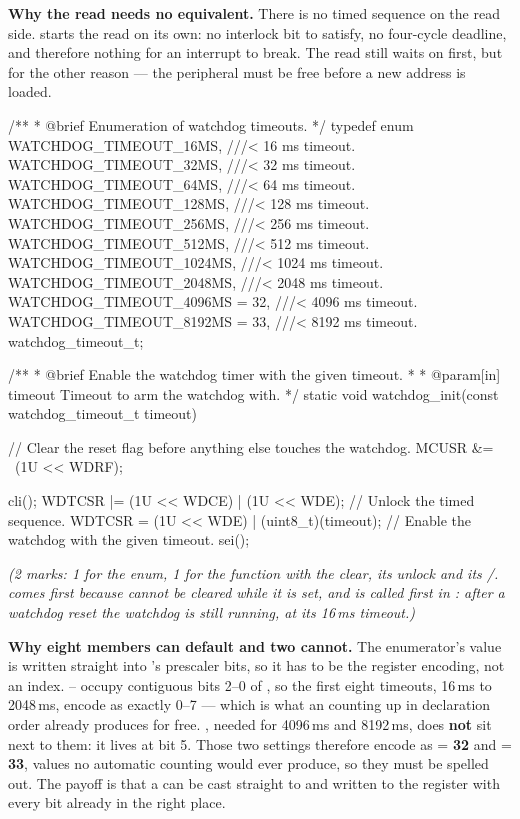 \textbf{Why the read needs no equivalent.} There is no timed sequence on the read side. 
starts the read on its own: no interlock bit to satisfy, no four-cycle deadline, and therefore
nothing for an interrupt to break. The read still waits on  first, but for the other
reason --- the peripheral must be free before a new address is loaded. 

\begin{ccode}
/**
 * @brief Enumeration of watchdog timeouts.
 */
typedef enum
{
    WATCHDOG_TIMEOUT_16MS,        ///< 16 ms timeout.
    WATCHDOG_TIMEOUT_32MS,        ///< 32 ms timeout.
    WATCHDOG_TIMEOUT_64MS,        ///< 64 ms timeout.
    WATCHDOG_TIMEOUT_128MS,       ///< 128 ms timeout.
    WATCHDOG_TIMEOUT_256MS,       ///< 256 ms timeout.
    WATCHDOG_TIMEOUT_512MS,       ///< 512 ms timeout.
    WATCHDOG_TIMEOUT_1024MS,      ///< 1024 ms timeout.
    WATCHDOG_TIMEOUT_2048MS,      ///< 2048 ms timeout.
    WATCHDOG_TIMEOUT_4096MS = 32, ///< 4096 ms timeout.
    WATCHDOG_TIMEOUT_8192MS = 33, ///< 8192 ms timeout.
} watchdog_timeout_t;

/**
 * @brief Enable the watchdog timer with the given timeout.
 *
 * @param[in] timeout Timeout to arm the watchdog with.
 */
static void watchdog_init(const watchdog_timeout_t timeout)
{
    // Clear the reset flag before anything else touches the watchdog.
    MCUSR &= ~(1U << WDRF);

    cli();
    WDTCSR |= (1U << WDCE) | (1U << WDE);      // Unlock the timed sequence.
    WDTCSR = (1U << WDE) | (uint8_t)(timeout); // Enable the watchdog with the given timeout.
    sei();
}
\end{ccode}

{\itshape (2 marks: 1 for the enum, 1 for the function with the  clear, its unlock and
its /.  comes first because  cannot be cleared while it
is set, and  is called first in : after a watchdog reset the
watchdog is still running, at its 16\,ms timeout.)\par}

\medskip \textbf{Why eight members can default and two cannot.} The enumerator's value is written
straight into 's prescaler bits, so it has to be the register encoding, not an index.
-- occupy contiguous bits 2--0 of , so the first eight timeouts,
16\,ms to 2048\,ms, encode as exactly 0--7 --- which is what an  counting up in
declaration order already produces for free. , needed for 4096\,ms and 8192\,ms, does
\textbf{not} sit next to them: it lives at bit 5. Those two settings therefore encode as  = \textbf{32} and  = \textbf{33}, values no automatic counting would
ever produce, so they must be spelled out. The payoff is that a  can be
cast straight to  and written to the register with every bit already in the right
place. 

